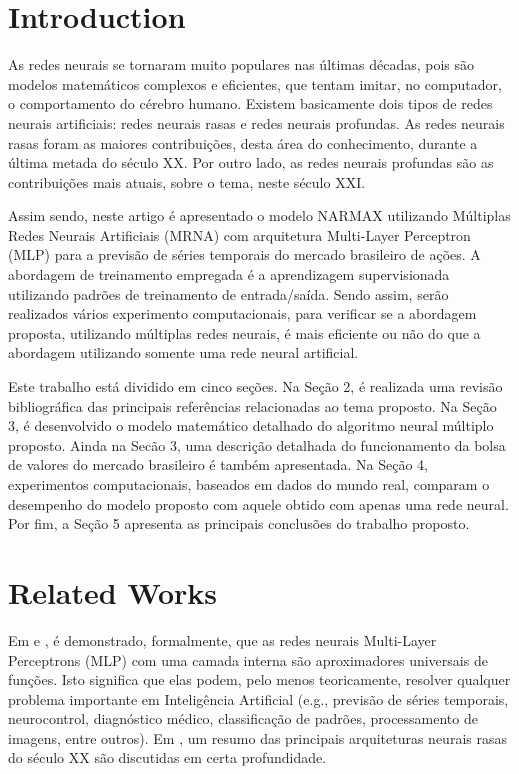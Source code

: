 \documentclass[journal,article,submit,pdftex,moreauthors]{Definitions/mdpi}
\begin{document}

\section{Introduction}

 

As redes neurais se tornaram muito populares nas últimas décadas, pois são modelos matemáticos complexos e eficientes, que tentam imitar, no computador, o comportamento do cérebro humano. Existem basicamente dois tipos de redes neurais artificiais: redes neurais rasas e redes neurais profundas. As redes neurais rasas foram as maiores contribuições, desta área do conhecimento, durante a última metada do século XX. Por outro lado, as redes neurais profundas são as contribuições mais atuais, sobre o tema, neste século XXI.

Assim sendo, neste artigo é apresentado o modelo NARMAX utilizando Múltiplas Redes Neurais Artificiais (MRNA) com arquitetura Multi-Layer Perceptron (MLP) para a previsão de séries temporais do mercado brasileiro de ações.  A abordagem de treinamento empregada é a aprendizagem supervisionada utilizando padrões de treinamento de entrada/saída. Sendo assim, serão realizados vários experimento computacionais, para verificar se a abordagem proposta, utilizando múltiplas redes neurais, é mais eficiente ou não do que a abordagem utilizando somente uma rede neural artificial.

Este trabalho está dividido em cinco seções. Na Seção 2, é realizada uma revisão bibliográfica das principais referências relacionadas ao tema proposto. Na Seção 3, é desenvolvido o modelo matemático detalhado do algoritmo neural múltiplo proposto. Ainda na Secão 3, uma descrição detalhada do funcionamento da bolsa de valores do mercado brasileiro é também apresentada. Na Seção 4, experimentos computacionais, baseados em dados do mundo real, comparam o desempenho do modelo proposto com aquele obtido com apenas uma rede neural. Por fim, a Seção 5 apresenta as principais conclusões do trabalho proposto.  

\section{Related Works}

Em \cite{ref1} e \cite{ref2}, é demonstrado, formalmente, que as redes neurais Multi-Layer Perceptrons (MLP) com uma camada interna são aproximadores universais de funções. Isto significa que elas podem, pelo menos teoricamente, resolver qualquer problema importante em Inteligência Artificial (e.g., previsão de séries temporais, neurocontrol, diagnóstico médico, classificação de padrões, processamento de imagens, entre outros). Em \cite{ref3}, um resumo das principais arquiteturas neurais rasas do século XX são discutidas em certa profundidade. 
\end{document}
